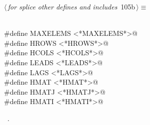 \documentclass{article}
\begin{document}
\begin{flushleft} \small
\begin{minipage}{\linewidth}\label{scrap191}\raggedright\small
{} $\langle\,${\itshape for splice other defines and includes}\nobreak\ {\footnotesize {105b}}$\,\rangle\equiv$
\vspace{-1ex}
\begin{list}{}{} \item
\mbox{}\verb@@\\
\mbox{}\verb@#define MAXELEMS <*MAXELEMS*>@\\
\mbox{}\verb@#define HROWS  <*HROWS*>@\\
\mbox{}\verb@#define HCOLS  <*HCOLS*>@\\
\mbox{}\verb@#define LEADS  <*LEADS*>@\\
\mbox{}\verb@#define LAGS  <*LAGS*>@\\
\mbox{}\verb@#define HMAT <*HMAT*>@\\
\mbox{}\verb@#define HMATJ <*HMATJ*>@\\
\mbox{}\verb@#define HMATI <*HMATI*>@\\
\mbox{}\verb@@{\NWsep}
\end{list}
\vspace{-1.5ex}
\footnotesize
\begin{list}{}{\setlength{\itemsep}{-\parsep}\setlength{\itemindent}{-\leftmargin}}
\item \NWtxtMacroRefIn\ .

\item{}
\end{list}
\end{minipage}\vspace{4ex}
\end{flushleft}
\end{document}
